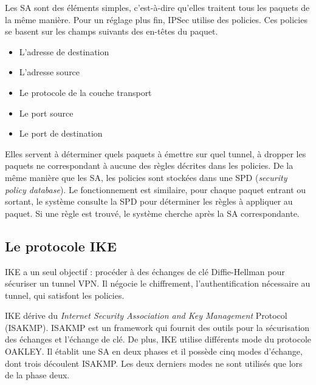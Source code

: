 Les SA sont des éléments simples, c'est-à-dire qu'elles traitent tous les paquets de la même manière. 
Pour un réglage plus fin, IPSec utilise des policies. 
Ces policies se basent sur les champs suivants des en-têtes du paquet.
\begin{itemize}
\item L'adresse de destination
\item L'adresse source
\item Le protocole de la couche transport
\item Le port source
\item Le port de destination
\end{itemize}
Elles servent à déterminer quels paquets à émettre sur quel tunnel, à dropper les paquets ne correspondant à aucune des règles décrites dans les policies. 
De la même manière que les SA, les policies sont stockées dans une SPD (\textit{security policy database}). 
Le fonctionnement est similaire, pour chaque paquet entrant ou sortant, le système consulte la SPD pour déterminer les règles à appliquer au paquet. Si une règle est trouvé, le système cherche après la SA correspondante.

\subsection{Le protocole IKE}
IKE a un seul objectif : procéder à des échanges de clé Diffie-Hellman pour sécuriser un tunnel VPN. 
Il négocie le chiffrement, l'authentification nécessaire au tunnel, qui satisfont les policies. 

IKE dérive du \textit{Internet Security Association and Key Management} Protocol (ISAKMP). 
ISAKMP est un framework qui fournit des outils pour la sécurisation des échanges et l'échange de clé. 
De plus, IKE utilise différents mode du protocole OAKLEY.
Il établit une SA en deux phases et il possède cinq modes d'échange, dont trois découlent ISAKMP.
Les deux derniers modes ne sont utilisés que lors de la phase deux.

